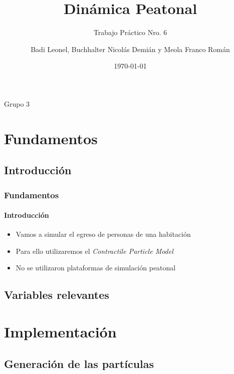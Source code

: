 \documentclass[hyperref={pdfpagelayout=SinglePage}]{beamer}
\title{Dinámica Peatonal}
\subtitle{Trabajo Práctico Nro. 6}
\author{Badi Leonel, Buchhalter Nicolás Demián y Meola Franco Román}
\date{\today}
\makeatletter
\newcommand{\parttableofcontents}{\@starttoc{parttoc}}
\makeatother
\begin{document}
\begin{frame}[plain]
    \frametitle{} 
    \titlepage
    \centering
	Grupo 3
\end{frame}



\section{Fundamentos}

\subsection{Introducción}

\begin{frame}
\frametitle{Fundamentos}
\framesubtitle{Introducción}
\begin{itemize}
	\item Vamos a simular el egreso de personas de una habitación
	\item Para ello utilizaremos el \textit{Contractile Particle Model} 
	\item No se utilizaron plataformas de simulación peatonal 
\end{itemize}
\end{frame}

\subsection{Variables relevantes}

\section{Implementación}

\subsection{Generación de las partículas}
\end{document}
